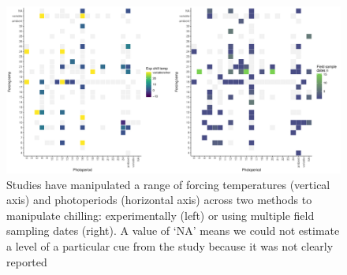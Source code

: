 \documentclass[11pt,letter]{article}
\begin{document}
\clearpage
\begin{figure}[t!]
\centering
\includegraphics[width=1.1\textwidth]{..//..//analyses/limitingcues/figures/heatmapphotoxforcexchill2panel.pdf}
\caption{Studies have manipulated a range of forcing temperatures (vertical axis) and photoperiods (horizontal axis) across two methods to manipulate chilling: experimentally (left) or using multiple field sampling dates (right). A value of `NA' means we could not estimate a level of a particular cue from the study because it was not clearly reported}
  \label{fig:heatmaps} 
\end{figure}

\clearpage
\end{document}
